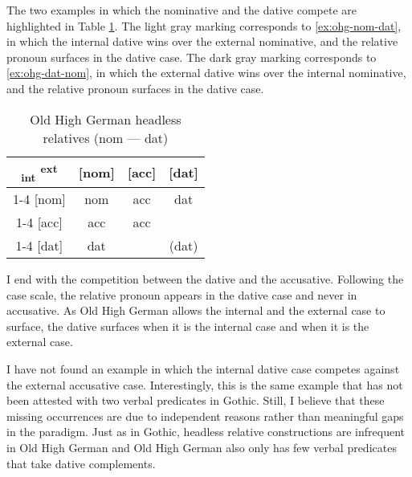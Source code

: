 The two examples in which the nominative and the dative compete are highlighted in Table \ref{tbl:summary-old-high-german-nom-dat}. The light gray marking corresponds to \ref{ex:ohg-nom-dat}, in which the internal dative wins over the external nominative, and the relative pronoun surfaces in the dative case. The dark gray marking corresponds to \ref{ex:ohg-dat-nom}, in which the external dative wins over the internal nominative, and the relative pronoun surfaces in the dative case.

\begin{table}[ht]
  \center
  \caption{Old High German headless relatives (\ac{nom} --- \ac{dat})}
  \begin{tabular}{c|c|c|c}
    \toprule
        \textsubscript{\ac{int}} \textsuperscript{\ac{ext}}
          & [\ac{nom}]
          & [\ac{acc}]
          & [\ac{dat}]
          \\ \cmidrule{1-4}
      [\ac{nom}]
          & \ac{nom}
          & \ac{acc}
          & \cellcolor{DG}\ac{dat}
          \\ \cmidrule{1-4}
      [\ac{acc}]
          & \ac{acc}
          & \ac{acc}
          &
          \\ \cmidrule{1-4}
      [\ac{dat}]
          & \cellcolor{LG}\ac{dat}
          &
          & (\ac{dat})
          \\
    \bottomrule
  \end{tabular}
    \label{tbl:summary-old-high-german-nom-dat}
\end{table}

I end with the competition between the dative and the accusative. Following the case scale, the relative pronoun appears in the dative case and never in accusative. As Old High German allows the internal and the external case to surface, the dative surfaces when it is the internal case and when it is the external case.

I have not found an example in which the internal dative case competes against the external accusative case.
Interestingly, this is the same example that has not been attested with two verbal predicates in Gothic.
Still, I believe that these missing occurrences are due to independent reasons rather than meaningful gaps in the paradigm.
Just as in Gothic, headless relative constructions are infrequent in Old High German and Old High German also only has few verbal predicates that take dative complements.


